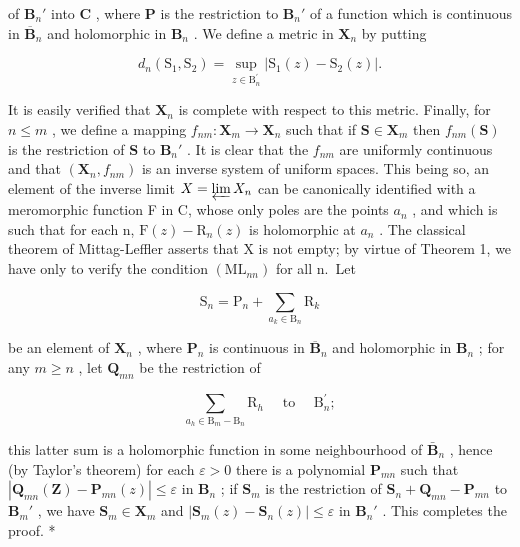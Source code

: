 of \(\mathbf{B}_n'\) into \(\mathbf{C}\) , where \(\mathbf{P}\) is the restriction to \(\mathbf{B}_n'\) of a function which is continuous in \(\overline{\mathbf{B}}_n\) and holomorphic in \(\mathbf{B}_n\) . We define a metric in \(\mathbf{X}_n\) by putting

\[
d _ {n} \left(\mathrm{S} _ {1}, \mathrm{S} _ {2}\right) = \sup _ {z \in \mathrm{B} _ {n} ^ {\prime}} | \mathrm{S} _ {1} (z) - \mathrm{S} _ {2} (z) |.
\]

It is easily verified that \(\mathbf{X}_n\) is complete with respect to this metric. Finally, for \(n \leqslant m\) , we define a mapping \(f_{nm}: \mathbf{X}_m \to \mathbf{X}_n\) such that if \(\mathbf{S} \in \mathbf{X}_m\) then \(f_{nm}(\mathbf{S})\) is the restriction of \(\mathbf{S}\) to \(\mathbf{B}_n'\) . It is clear that the \(f_{nm}\) are uniformly continuous and that \((\mathbf{X}_n, f_{nm})\) is an inverse system of uniform spaces. This being so, an element of the inverse limit \(X = \varprojlim X_{n}\) can be canonically identified with a meromorphic function F in C, whose only poles are the points \(a_{n}\) , and which is such that for each n, \(\mathrm{F}(z) - \mathrm{R}_{n}(z)\) is holomorphic at \(a_{n}\) . The classical theorem of Mittag-Leffler asserts that X is not empty; by virtue of Theorem 1, we have only to verify the condition \((\mathrm{ML}_{nn})\) for all n.~Let

\[
\mathrm{S} _ {n} = \mathrm{P} _ {n} + \sum_ {a _ {k} \in \mathrm{B} _ {n}} \mathrm{R} _ {k}
\]

be an element of \(\mathbf{X}_n\) , where \(\mathbf{P}_n\) is continuous in \(\overline{\mathbf{B}}_n\) and holomorphic in \(\mathbf{B}_n\) ; for any \(m \geqslant n\) , let \(\mathbf{Q}_{mn}\) be the restriction of

\[
\sum_ {a _ {h} \in \mathrm{B} _ {m} - \mathrm{B} _ {n}} \mathrm{R} _ {h} \quad \text { to } \quad \mathrm{B} _ {n} ^ {\prime};
\]

this latter sum is a holomorphic function in some neighbourhood of \(\bar{\mathbf{B}}_n\) , hence (by Taylor's theorem) for each \(\varepsilon > 0\) there is a polynomial \(\mathbf{P}_{mn}\) such that \(|\mathbf{Q}_{mn}(\mathbf{Z}) - \mathbf{P}_{mn}(z)| \leqslant \varepsilon\) in \(\mathbf{B}_n\) ; if \(\mathbf{S}_m\) is the restriction of \(\mathbf{S}_n + \mathbf{Q}_{mn} - \mathbf{P}_{mn}\) to \(\mathbf{B}_m'\) , we have \(\mathbf{S}_m \in \mathbf{X}_m\) and \(|\mathbf{S}_m(z) - \mathbf{S}_n(z)| \leqslant \varepsilon\) in \(\mathbf{B}_n'\) . This completes the proof. *


